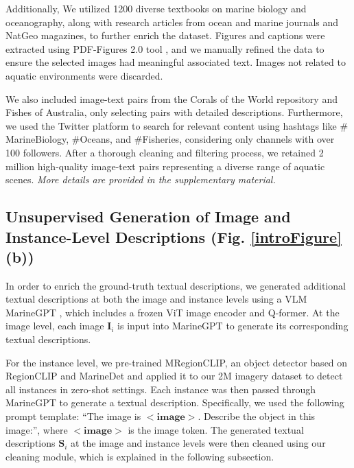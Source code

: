 Additionally, We utilized 1200 diverse textbooks on marine biology and oceanography, along with research articles from ocean and marine journals and NatGeo magazines, to further enrich the dataset. 
Figures and captions were extracted using PDF-Figures 2.0 tool \cite{clark2016pdffigures}, and we manually refined the data to ensure the selected images had meaningful associated text. 
Images not related to aquatic environments were discarded.

We also included image-text pairs from the Corals of the World repository and Fishes of Australia, only selecting pairs with detailed descriptions. 
Furthermore, we used the Twitter platform to search for relevant content using hashtags like $\#$MarineBiology, $\#$Oceans, and $\#$Fisheries, considering only channels with over 100 followers. 
After a thorough cleaning and filtering process, we retained 2 million high-quality image-text pairs representing a diverse range of aquatic scenes.
\textit{More details are provided in the supplementary material.}
\subsection{Unsupervised Generation of Image and Instance-Level Descriptions (Fig. \ref{introFigure} (b))} 
\label{sec:generation}
In order to enrich the ground-truth textual descriptions, we generated additional textual descriptions at both the image and instance levels using a VLM MarineGPT \cite{zheng2023marinegpt}, which includes a frozen ViT image encoder and Q-former.
At the image level, each image $\textbf{I}_{i}$ is input into MarineGPT to generate its corresponding textual descriptions. 

For the instance level, we pre-trained MRegionCLIP, an object detector based on RegionCLIP \cite{zhong2022regionclip} and MarineDet \cite{haixin2023marinedet} and applied it to our 2M imagery dataset to detect all instances in zero-shot settings. 
Each instance was then passed through MarineGPT to generate a textual description.
Specifically, we used the following prompt template: ``The image is $<\textbf{image}>$. Describe the object in this image:'', where $<\textbf{image}>$ is the image token.
The generated textual descriptions $\textbf{S}_{i}$ at the image and instance levels were then cleaned using our cleaning module, which is explained in the following subsection.

